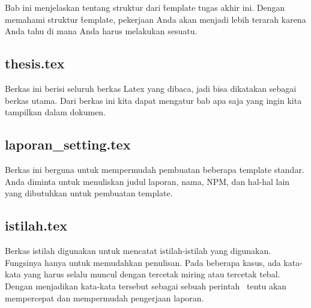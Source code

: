 \chapter{\babEmpat}
\label{bab:4}
Bab ini menjelaskan tentang struktur dari \f{template} tugas akhir ini.
Dengan memahami struktur \f{template}, pekerjaan Anda akan menjadi lebih terarah karena Anda tahu di mana Anda harus melakukan sesuatu.



\section{thesis.tex}
\label{sec:thesis-tex}
Berkas ini berisi seluruh berkas Latex yang dibaca, jadi bisa dikatakan sebagai berkas utama.
Dari berkas ini kita dapat mengatur bab apa saja yang ingin kita tampilkan dalam dokumen.


\section{laporan\_setting.tex}
\label{sec:laporan-setting-tex}
Berkas ini berguna untuk mempermudah pembuatan beberapa template standar.
Anda diminta untuk menuliskan judul laporan, nama, NPM, dan hal-hal lain yang dibutuhkan untuk pembuatan template.


\section{istilah.tex}
\label{sec:istilah-tex}
Berkas istilah digunakan untuk mencatat istilah-istilah yang digunakan.
Fungsinya hanya untuk memudahkan penulisan.
Pada beberapa kasus, ada kata-kata yang harus selalu muncul dengan tercetak miring atau tercetak tebal.
Dengan menjadikan kata-kata tersebut sebagai sebuah perintah \latex~tentu akan mempercepat dan mempermudah pengerjaan laporan.


